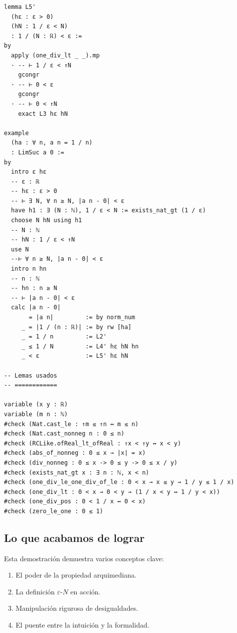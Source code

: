 \begin{verbatim}
lemma L5'
  (hε : ε > 0)
  (hN : 1 / ε < N)
  : 1 / (N : ℝ) < ε :=
by
  apply (one_div_lt _ _).mp
  · -- ⊢ 1 / ε < ↑N
    gcongr
  · -- ⊢ 0 < ε
    gcongr
  · -- ⊢ 0 < ↑N
    exact L3 hε hN

example
  (ha : ∀ n, a n = 1 / n)
  : LimSuc a 0 :=
by
  intro ε hε
  -- ε : ℝ
  -- hε : ε > 0
  -- ⊢ ∃ N, ∀ n ≥ N, |a n - 0| < ε
  have h1 : ∃ (N : ℕ), 1 / ε < N := exists_nat_gt (1 / ε)
  choose N hN using h1
  -- N : ℕ
  -- hN : 1 / ε < ↑N
  use N
  --⊢ ∀ n ≥ N, |a n - 0| < ε
  intro n hn
  -- n : ℕ
  -- hn : n ≥ N
  -- ⊢ |a n - 0| < ε
  calc |a n - 0|
       = |a n|         := by norm_num
     _ = |1 / (n : ℝ)| := by rw [ha]
     _ = 1 / n         := L2'
     _ ≤ 1 / N         := L4' hε hN hn
     _ < ε             := L5' hε hN

-- Lemas usados
-- ============

variable (x y : ℝ)
variable (m n : ℕ)
#check (Nat.cast_le : ↑m ≤ ↑n ↔ m ≤ n)
#check (Nat.cast_nonneg n : 0 ≤ n)
#check (RCLike.ofReal_lt_ofReal : ↑x < ↑y ↔ x < y)
#check (abs_of_nonneg : 0 ≤ x → |x| = x)
#check (div_nonneg : 0 ≤ x -> 0 ≤ y -> 0 ≤ x / y)
#check (exists_nat_gt x : ∃ n : ℕ, x < n)
#check (one_div_le_one_div_of_le : 0 < x → x ≤ y → 1 / y ≤ 1 / x)
#check (one_div_lt : 0 < x → 0 < y → (1 / x < y ↔ 1 / y < x))
#check (one_div_pos : 0 < 1 / x ↔ 0 < x)
#check (zero_le_one : 0 ≤ 1)
\end{verbatim}

\subsection{Lo que acabamos de lograr}
Esta demostración demuestra varios conceptos clave:
\begin{enumerate}
    \item El poder de la propiedad arquimediana.
    \item La definición $\varepsilon$-$N$ en acción.
    \item Manipulación rigurosa de desigualdades.
    \item El puente entre la intuición y la formalidad.
\end{enumerate}

